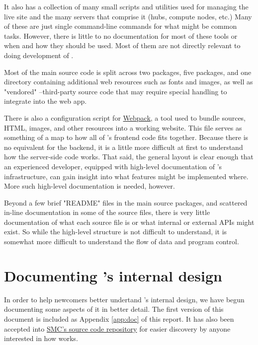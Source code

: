 \documentclass{deliverablereport}
\renewcommand{\SMC}{\software{SMC}}
\begin{document}
It also has a collection of many small scripts and utilities used for managing
the live \SMC site and the many servers that comprise it (hubs, compute nodes,
etc.)  Many of these are just single command-line commands for what might be
common tasks.  However, there is little to no documentation for most of these
tools or when and how they should be used.  Most of them are not directly
relevant to doing development of \SMC.

Most of the main \SMC source code is split across two \Python packages, five
\JavaScript packages, and one directory containing additional web resources
such as fonts and images, as well as "vendored" \JavaScript--third-party source
code that may require special handling to integrate into the \SMC web app.

There is also a configuration script for
\href{https://webpack.github.io/}{Webpack}, a tool used to bundle \JavaScript
sources, HTML, images, and other resources into a working website.  This file
serves as something of a map to how all of \SMC's frontend code fits together.
Because there is no equivalent for the backend, it is a little more difficult
at first to understand how the server-side code works.  That said, the general
layout is clear enough that an experienced developer, equipped with high-level
documentation of \SMC's infrastructure, can gain insight into what features
might be implemented where.  More such high-level documentation is needed,
however.

Beyond a few brief "README" files in the main source packages, and scattered
in-line documentation in some of the source files, there is very little
documentation of what each source file is or what internal or external APIs
might exist.  So while the high-level structure is not difficult to understand,
it is somewhat more difficult to understand the flow of data and program
control.

\section{Documenting \SMC's internal design}

In order to help newcomers better undertand \SMC's internal design, we have
begun documenting some aspects of it in better detail.  The first version of
this document is included as Appendix \ref{app:doc} of this report. It has also
been accepted into
\href{https://github.com/sagemathinc/smc/blob/master/src/doc/design_overview/overview.rst}{SMC's
source code repository} for easier discovery by anyone interested in how \SMC
works.
\end{document}

